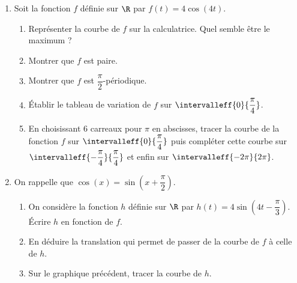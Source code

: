 \documentclass[12pt,openright,twoside,french]{book}
\begin{document}
\begin{enumerate}
    \item Soit la fonction $f$ définie sur $\R$ par $f(t) = 4\cos(4t)$.
        \begin{enumerate}
            \item Représenter la courbe de $f$ sur la calculatrice. Quel semble être le maximum ?
            \item Montrer que $f$ est paire.
            \item Montrer que $f$ est $\dfrac{\pi}{2}$-périodique.
            \item \'Etablir le tableau de variation de $f$ sur $\intervalleff{0}{\dfrac{\pi}{4}}$.
            \item En choisissant $6$ carreaux pour $\pi$ en abscisses, tracer la courbe de la fonction $f$ sur $\intervalleff{0}{\dfrac{\pi}{4}}$ puis compléter cette courbe sur $\intervalleff{-\dfrac{\pi}{4}}{\dfrac \pi 4}$ et enfin sur $\intervalleff{-2\pi}{2\pi}$.
        \end{enumerate}
    \item On rappelle que $\cos(x) = \sin\left(x + \dfrac\pi 2\right)$.
        \begin{enumerate}
            \item On considère la fonction $h$ définie sur $\R$ par $h(t) = 4\sin\left(4t - \dfrac\pi 3\right)$. \'Ecrire $h$ en fonction de $f$.
            \item En déduire la translation qui permet de passer de la courbe de $f$ à celle de $h$.
            \item Sur le graphique précédent, tracer la courbe de $h$.
        \end{enumerate}
\end{enumerate}
\end{document}
